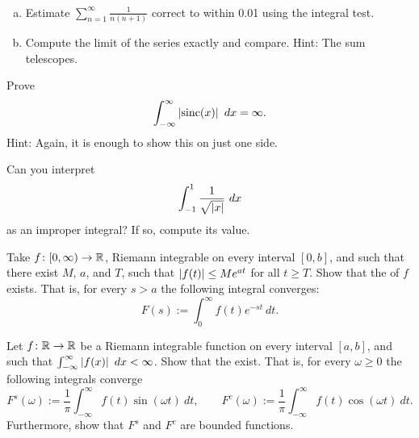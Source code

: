 \begin{exercise}
{\ }
\begin{enumerate}[a)]
\item
Estimate $\sum\limits_{n=1}^\infty \frac{1}{n(n+1)}$ correct to within 0.01
using the integral test.
\item
Compute the limit of the series exactly
and compare.  Hint: The sum telescopes.
\end{enumerate}
\end{exercise}

\begin{exercise}
Prove 
\begin{equation*}
\int_{-\infty}^\infty \left\lvert {\operatorname{sinc}(x)} \right\rvert~dx = \infty .
\end{equation*}
Hint: Again, it is enough to show this on just one side.
\end{exercise}

\begin{exercise}
Can you interpret
\begin{equation*}
\int_{-1}^1 \frac{1}{\sqrt{\left\lvert {x} \right\rvert}}~dx
\end{equation*}
as an improper integral?  If so, compute its value.
\end{exercise}

\begin{exercise}
Take $f \colon [0,\infty) \to {\mathbb{R}}$, Riemann integrable on
every interval $[0,b]$, and such that there exist $M$, $a$, and $T$,
such that $\left\lvert {f(t)} \right\rvert \leq M e^{at}$ for all $t \geq T$.  Show that the
\emph{} of $f$ exists.  That is, for
every $s > a$ the following integral converges:
\begin{equation*}
F(s) := \int_{0}^\infty f(t) e^{-st} ~dt .
\end{equation*}
\end{exercise}

\begin{exercise}
Let $f \colon {\mathbb{R}} \to {\mathbb{R}}$ be a Riemann integrable function
on every interval $[a,b]$, and such
that $\int_{-\infty}^\infty \left\lvert {f(x)} \right\rvert~dx < \infty$.  Show that the
\emph{}
exist.  That is, for every $\omega \geq 0$ the
following integrals converge
\begin{equation*}
F^s(\omega) := \frac{1}{\pi} \int_{-\infty}^\infty f(t) \sin(\omega t) ~dt ,
\qquad
F^c(\omega) := \frac{1}{\pi} \int_{-\infty}^\infty f(t) \cos(\omega t) ~dt .
\end{equation*}
Furthermore, show that $F^s$ and $F^c$ are bounded functions.
\end{exercise}

